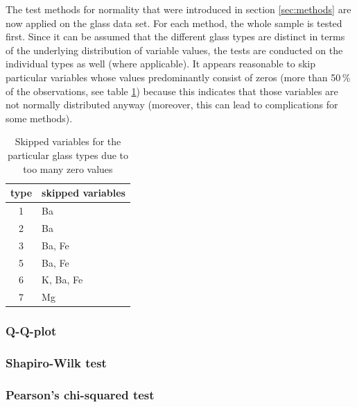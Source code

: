 \documentclass[a4paper, 12pt, titlepage, headsepline, listof = totoc, bibliography = totoc, numbers = noenddot]{scrartcl}
\begin{document}
The test methods for normality that were introduced in section \ref{sec:methods} are now applied on the glass data set. For each method, the whole sample is tested first. Since it can be assumed that the different glass types are distinct in terms of the underlying distribution of variable values, the tests are conducted on the individual types as well (where applicable). It appears reasonable to skip particular variables whose values predominantly consist of zeros (more than 50\,\% of the observations, see table \ref{tab:zeros}) because this indicates that those variables are not normally distributed anyway (moreover, this can lead to complications for some methods).

\begin{table}[h!]
\centering
\begin{tabular}{|cl|}
\hline
type & skipped variables\\
\hline
1 & Ba\\
2 & Ba\\
3 & Ba, Fe\\
5 & Ba, Fe\\
6 & K, Ba, Fe\\
7 & Mg\\
\hline
\end{tabular}
\caption{Skipped variables for the particular glass types due to too many zero values}
\label{tab:zeros}
\end{table}

\subsubsection{Q-Q-plot}

\subsubsection{Shapiro-Wilk test}

\subsubsection{Pearson's chi-squared test}
\end{document}
